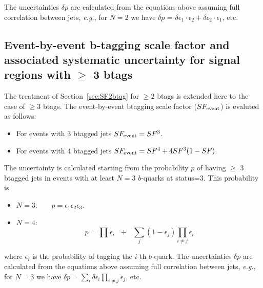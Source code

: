 The uncertainties $\delta p$ are calculated from the equations above assuming full 
correlation between jets, {\em e.g.}, for $N=2$ we have 
$\delta p$ = $\delta \epsilon_1 \cdot \epsilon_2 + \delta \epsilon_2 \cdot \epsilon_1$, etc.


\subsection{Event-by-event b-tagging scale factor and 
associated systematic uncertainty for signal regions with $\geq$ 3 btags}
\label{sec:SF3btag}
The treatment of Section~\ref{sec:SF2btag} for $\geq 2$ btags
is extended here to the case of $\geq 3$ btags.  
The event-by-event btagging scale factor ($SF_{\rm event}$) is evaluted
as follows:

\begin{itemize}
\item For events with 3 btagged jets $SF_{\rm event}=SF^3$.

\item For events with 4 btagged jets 
$SF_{\rm event}=SF^4 + 4SF^3(1-SF)$.

\end{itemize}

The uncertainty is calculated starting from the probability $p$ 
of having $\geq$ 3 btagged jets in events with at least $N=3$ $b$-quarks
at status=3.  This probability is

\begin{itemize}

\item $N = 3$:~~~~$p = \epsilon_1 \epsilon_2 \epsilon_3$.

\item $N = 4$:~~~~$$p = \prod{\epsilon_i}~~~+~~~\sum_j{(1-\epsilon_j)\prod_{i \ne j}{\epsilon_i}}$$

\end{itemize}

\noindent where $\epsilon_i$ is the probability of tagging the $i$-th $b$-quark.
The uncertainties $\delta p$ are calculated from the equations above assuming full 
correlation between jets, {\em e.g.}, for $N=3$ we have 
$\delta p = \sum_{i} \delta \epsilon_i \prod_{i \neq j} \epsilon_j$, etc.